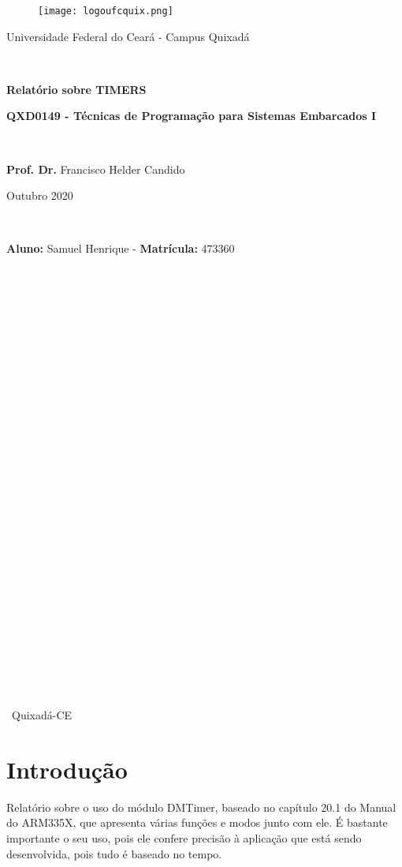 \documentclass[12pt]{article}
\begin{document}
	\begin{center}
		\begin{figure}[h!]
			\centering
			\texttt{[image: logoufcquix.png]}
			
		\end{figure}
		
		\large{Universidade Federal do Ceará - Campus Quixadá}
		\
		
		\
		
		\Large {\textbf{Relatório sobre TIMERS}} 
		
		\textbf{QXD0149 - Técnicas de Programação para Sistemas Embarcados I}
		
		\
		
		\large{\textbf{Prof. Dr.} Francisco Helder Candido}
		
		Outubro 2020
		
		\
		
		\textbf{Aluno:} Samuel Henrique - \textbf{Matrícula:} 473360 \\
		
		\
		
		\
		
		\
	\end{center}
	\begin{center}
		
		\
		
		\
		
		\
		
		\
		
		\
		
		\
		
		\
		
		\
		
		\
		
		\
		
		\
		
		\
		
		\
		
		\
		
		\
		Quixadá-CE \ \ \  
	\end{center} \par
	\thispagestyle{empty}
	\newpage
	\onehalfspacing
	\tableofcontents
	\thispagestyle{empty}
	\newpage
	
\section{Introdução}
	Relatório sobre o uso do módulo DMTimer, baseado no capítulo 20.1 do Manual do ARM335X, que apresenta várias funções e modos junto com ele. É bastante importante o seu uso, pois ele confere precisão à aplicação que está sendo desenvolvida, pois tudo é baseado no tempo. \
	
\end{document}
